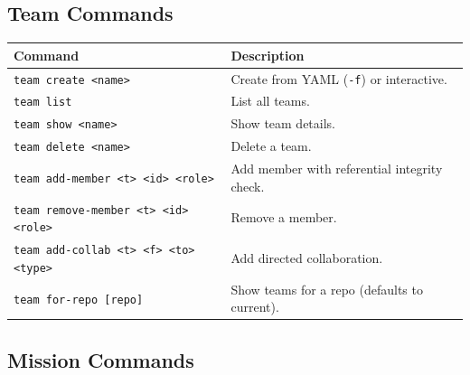 \documentclass[a4paper,10pt]{article}
\newcommand{\cmd}[1]{\texttt{#1}}
\begin{document}
\subsection{Team Commands}

\begin{center}
\begin{tabular}{@{}lp{6cm}@{}}
\toprule
\textbf{Command} & \textbf{Description} \\
\midrule
\cmd{team create <name>}                & Create from YAML (\cmd{-f})
                                          or interactive. \\
\cmd{team list}                          & List all teams. \\
\cmd{team show <name>}                   & Show team details. \\
\cmd{team delete <name>}                 & Delete a team. \\
\cmd{team add-member <t> <id> <role>}    & Add member with referential
                                          integrity check. \\
\cmd{team remove-member <t> <id> <role>} & Remove a member. \\
\cmd{team add-collab <t> <f> <to> <type>} & Add directed
                                          collaboration. \\
\cmd{team for-repo [repo]}               & Show teams for a repo
                                          (defaults to current). \\
\bottomrule
\end{tabular}
\end{center}

\subsection{Mission Commands}
\end{document}
